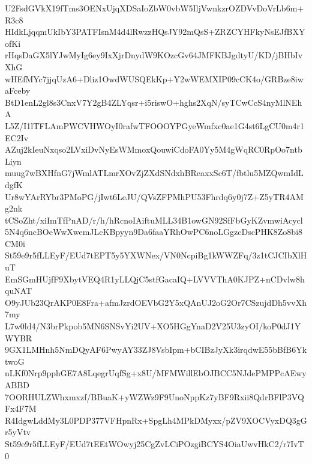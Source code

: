 U2FsdGVkX19fTms3OENxUjqXDSaIoZbW0vbW5IljVwnkzrOZDVvDoVrLb6m+R3c8
HIdkLjqqmUkIbY3PATFIsnM4d4lRwzzHQsJY92mQsS+ZRZCYHFkyNsEJfBXYofKi
rHqsDaGX5lYJwMyIg6ey9IxXjrDnydW9KOzcGv64JMFKBJgdtyU/KD/jBHbIvXhG
wHEfMYc7jjqUzA6+Dliz1OwdWUSQEkKp+Y2wWEMXIP09cCK4o/GRBze8iwaFceby
BtD1enL2gl8s3CnxV7Y2gB4ZLYqsr+i5riswO+hghs2XqN/syTCwCcS4nyMlNEhA
L5Z/I1lTFLAmPWCVHWOyI0rafwTFOOOYPGyeWmfxc0ae1G4st6LgCU0m4r1EC2Iv
AZuj2kIeuNxqso2LVxiDvNyEsWMmoxQouwiCdoFA0Yy5M4gWqRC0RpOo7ntbLiyn
muug7wBXHfnG7jWmlATLmrXOvZjZXdSNdxhBReaxxSc6T/fbtlu5MZQwmIdLdgfK
Ur8wYArRYbr3PMoPG/jIwt6LeJU/QVsZFPMhPU53Fhrdq6y0j7Z+Z5yTR4AMg2nk
tCSoZht/xiImTfPnAD/r/h/hRcnoIAiftuMLL34B1owGN92SfFbGyKZvmwiAcycl
5N4q6ncBOeWwXwemJLcKBpyyn9Da6faaYRhOwPC6noLGgzcDscPHK8Zo8bi8CM0i
St59e9r5fLLEyF/EUd7tEPT5y5YXWNex/VN0NcpiBg1kWWZFq/3z1tCJCIbXlHuT
EmSGmHUjfF9XbytVEQ4R1yLLQjC5stfGacaIQ+LVVVThA0KJPZ+nCDvlw8hquNAT
O9yJUb23QrAKP0E8Fra+afmJzrdOEVbG2Y5xQAnUJ2oG2Or7CSzujdDh5vvXh7my
L7w0ld4/N3brPkpob5MN6SNSvYi2UV+XO5HGgYnaD2V25U3zyOI/koP0dJ1YWYBR
9GX1LMHnh5NmDQyAF6PwyAY33ZJ8VsbIpm+bCIBzJyXk3irqdwE55bBfB6YktwoG
nLKf0Nrp9pphGE7A8LqegrUqfSg+x8U/MFMWillEbOJBCC5NJdePMPPcAEwyABBD
7OORHULZWhxmxzf/BBuaK+yWZWz9F9UnoNppKz7yBF9Rxii8QdrBFlP3VQFx4F7M
R4IdgwLddMy3L0PDP377VFHpnRx+SpgLh4MPkDMyxx/pZV9XOCVyxDQ3gGr5yVtv
St59e9r5fLLEyF/EUd7tEEtWOwyj25CgZvLCiPOzgiBCYS4OiaUwvHkC2/r7IvT0
